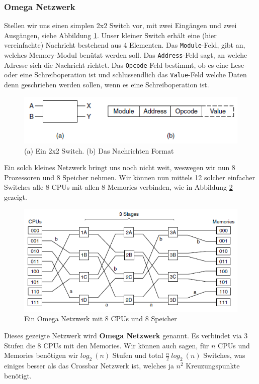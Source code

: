 \subsubsection{Omega Netzwerk}
Stellen wir uns einen simplen 2x2 Switch vor, mit zwei Eingängen und zwei Ausgängen, siehe Abbildung \ref{fig:omegaswitch}. Unser kleiner Switch erhält eine (hier vereinfachte) Nachricht bestehend aus 4 Elementen. Das \texttt{Module}-Feld, gibt an, welches Memory-Modul benützt werden soll. Das \texttt{Address}-Feld sagt, an welche Adresse sich die Nachricht richtet. Das \texttt{Opcode}-Feld bestimmt, ob es eine Lese- oder eine Schreiboperation ist und schlussendlich das \texttt{Value}-Feld welche Daten denn geschrieben werden sollen, wenn es eine Schreiboperation ist.
\begin{figure}[h]
	\centering
	\includegraphics[width=0.7\linewidth]{fig/omega_switch}
	\caption{(a) Ein 2x2 Switch. (b) Das Nachrichten Format}
	\label{fig:omegaswitch}
	\end{figure}

Ein solch kleines Netzwerk bringt uns noch nicht weit, weswegen wir nun 8 Prozessoren und 8 Speicher nehmen. Wir können nun mittels 12 solcher einfacher Switches alle 8 CPUs mit allen 8 Memories verbinden, wie in Abbildung \ref{fig:omega_gross} gezeigt.
\begin{figure}[h]
	\centering
	\includegraphics[width=0.7\linewidth]{fig/omega_gross}
	\caption{Ein Omega Netzwerk mit 8 CPUs und 8 Speicher}
	\label{fig:omega_gross}
	\end{figure}
Dieses gezeigte Netzwerk wird \textbf{Omega Netzwerk} genannt. Es verbindet via 3 Stufen die 8 CPUs mit den Memories. Wir können auch sagen, für $ n $ CPUs und Memories benötigen wir $ log_{2}\ (n) $ Stufen und total $ \frac{n}{2}\ log_{2}\ (n) $ Switches, was einiges besser als das Crossbar Netzwerk ist, welches ja $ n^{2} $ Kreuzungspunkte benötigt.


